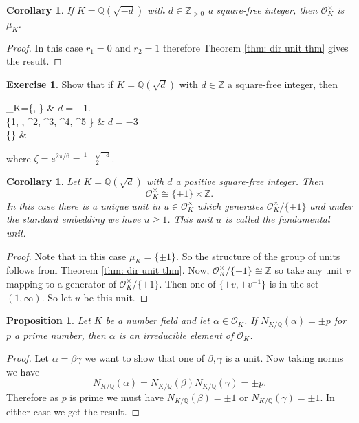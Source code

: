 \documentclass[11pt,a4paper]{report}
\theoremstyle{plain}
\newtheorem{cor}[subsection]{Corollary}
\newtheorem{prop}[subsection]{Proposition}
\theoremstyle{definition}
\theoremstyle{definition}
\newtheorem{question}[subsection]{Exercise}
\newcommand{\ZZ}{\mathbb{Z}}
\def\QQ{\mathbb{Q}}
\def \Nm {N_{K/\QQ}}
\def \a{\alpha}
\def \OO {\mathcal{O}}
\begin{document}
	\begin{cor}
		If $K=\QQ(\sqrt{-d})$ with $d \in \ZZ_{> 0}$ a square-free integer, then $\OO_K^\times$ is  $\mu_K$.
	\end{cor}
	
	\begin{proof}
		In this case $r_1=0$ and $r_2=1$ therefore Theorem \ref{thm: dir unit thm} gives the result.
	\end{proof}
	
	
	\begin{question}\label{ques: units in img quad}
		Show that if $K=\QQ(\sqrt{d})$ with $d \in \ZZ$ a square-free integer, then \begin{numcases}
			{\mu_K=}\{, \pm {}\} &  $d=-1$.\\
			\{1, \zeta, \zeta^2, \zeta^3, \zeta^4, \zeta^5  \} &  $d=-3$\\
			\{\} & 
		\end{numcases}
		where $\zeta=e^{2\pi/6}=\frac{1+\sqrt{-3}}{2}$.
	\end{question}
	
	\begin{cor}
		Let $K=\QQ(\sqrt{d})$ with $d$ a positive square-free integer. Then \[\OO_K^{\times} \cong \{\pm 1\} \times \ZZ.\] In this case there is a unique unit in $u \in \OO_K^{\times}$ which generates $\OO_K^\times/ \{\pm 1\}$ and under the standard embedding we have $u \geq 1$. This unit $u$ is called the fundamental unit.
	\end{cor}
	
	\begin{proof}
		Note that in this case $\mu_K=\{\pm 1\}$. So the structure of the group of units follows from Theorem \ref{thm: dir unit thm}. Now, $\OO_{K}^{\times}/\{\pm 1\} \cong \ZZ$ so take any unit $v$ mapping to a generator of  $\OO_{K}^{\times}/\{\pm 1\}$. Then one of $\{\pm v, \pm v^{-1}\}$  is in the set $(1,\infty)$. So let $u$ be this unit.
	\end{proof}
	
	
	
	
	
	
	
	\begin{prop}
		Let $K$ be a number field and let $\a \in \OO_K$. If $N_{K/\QQ}(\a)=\pm p$ for $p$ a prime number, then $\a$ is an irreducible element of $\OO_K$.
	\end{prop}
	
	\begin{proof}
		Let $\a=\beta \gamma$ we want to show that one of $\beta,\gamma$ is a unit. Now taking norms we have \[\Nm(\a)=\Nm(\beta)\Nm(\gamma)=\pm p. \] Therefore as $p$ is prime we must have $\Nm(\beta)=\pm 1$ or $\Nm(\gamma)=\pm 1$. In either case we get the result. 
	\end{proof}
	
\end{document}
